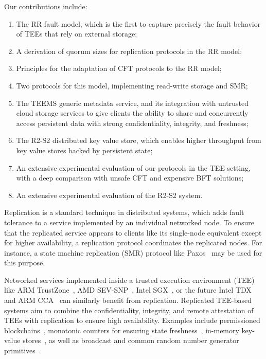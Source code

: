 Our contributions include:
\begin{enumerate}
    \item The \ac{RR} fault model, which is the first to capture
        precisely the fault behavior of \acp{TEE} that rely on external storage;
    \item A derivation of quorum sizes for replication protocols
        in the \ac{RR} model;
    \item Principles for the adaptation of \ac{CFT} protocols to
        the \ac{RR} model;
    \item Two protocols for this model, implementing read-write
        storage and \ac{SMR};
    \item The \ac{TEEMS} generic metadata service, and its integration with
        untrusted cloud storage services to give clients the ability to share
        and concurrently access persistent data with strong confidentiality,
        integrity, and freshness;
    \item The \ac{R2-S2} distributed key value store, which
        enables higher throughput from key value stores backed by
        persistent state;
    \item An extensive experimental evaluation of our protocols
        in the \ac{TEE} setting, with a deep comparison with
        unsafe \ac{CFT} and expensive \ac{BFT} solutions;
    \item An extensive experimental evaluation of the \ac{R2-S2}
        system.
\end{enumerate}


Replication is a standard technique in distributed systems, which adds
fault tolerance to a service implemented by an individual networked
node. To ensure that the replicated service appears to clients like
its single-node equivalent except for higher availability, a
replication protocol coordinates the replicated
nodes. For instance, a state machine replication (SMR) protocol like
Paxos~\cite{paxos} may be used for this purpose.

Networked services implemented inside a trusted execution environment
(TEE) like ARM TrustZone~\cite{armTZ}, AMD SEV-SNP~\cite{amdsev,
  amdsev-snp}, Intel SGX~\cite{intelsgx}, or the future Intel
TDX~\cite{inteltdx} and ARM CCA~\cite{arm-cca} can similarly benefit
from replication.  Replicated \ac{TEE}-based systems aim to combine the
confidentiality, integrity, and remote attestation of \acp{TEE} with
replication to ensure high availability.
Examples include permissioned blockchains~\cite{teechain}, monotonic
counters for ensuring state freshness~\cite{rote}, in-memory key-value
stores~\cite{avocado-atc21}, as well as broadcast and common random
number generator primitives~\cite{p2p-sgx}.

